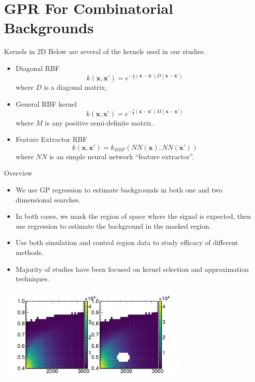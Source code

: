 \documentclass[10pt]{beamer}
\begin{document}
\section[GPR Result]{GPR For Combinatorial Backgrounds}
\label{sec:2d-gauss-proc}

\begin{frame}{Kernels in 2D}
  Below are several  of the kernels used in our studies.
  \begin{itemize}
  \item Diagonal RBF
    \begin{equation}
      k(\bm{x},\bm{x'}) = e^{ -\frac{1}{2} \left(  \bm{x} - \bm{x'}\right) D \left(  \bm{x} - \bm{x'}\right)}
    \end{equation}
    where $D$ is a diagonal matrix,
  \item General RBF kernel
    \begin{equation}
      k(\bm{x},\bm{x'}) = e^{ -\frac{1}{2} \left(  \bm{x} - \bm{x'}\right) M \left(  \bm{x} - \bm{x'}\right)}
    \end{equation}
    where $M$ is any positive semi-definite matrix.
  \item Feature Extractor RBF
    \begin{equation}
      k(\bm{x},\bm{x'}) =  k_{RBF}(NN(\bm{x}),NN(\bm{x'}))
    \end{equation}
    where $NN$ is an simple neural network ``feature extractor''.
  \end{itemize}
\end{frame}


\begin{frame}{Overview}
  \begin{itemize}
  \item We use GP regression to estimate backgrounds in both one and two dimensional searches.
  \item In both cases, we mask the region of space where the signal is expected, then use regression to estimate the background in the masked region.
  \item Use both simulation and control region data to study efficacy of different methods. 
  \item Majority of studies have been focused on kernel selection and approximation techniques.
  \end{itemize}
  \begin{center}
    \includegraphics[width=0.7\textwidth]{figures/example_masking}
  \end{center}
\end{frame}
\end{document}
